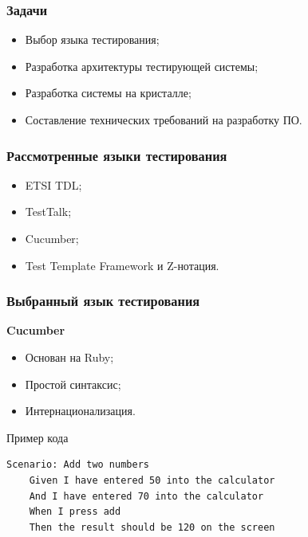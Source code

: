 \documentclass{beamer}
\begin{document}

\begin{frame}
\frametitle{Задачи}
\begin{itemize}
\item Выбор языка тестирования;
\item Разработка архитектуры тестирующей системы;
\item Разработка системы на кристалле;
\item Составление технических требований на разработку ПО.
\end{itemize}
\end{frame}


\begin{frame}
\frametitle{Рассмотренные языки тестирования}
\begin{itemize}
\item ETSI TDL;
\item TestTalk;
\item Cucumber;
\item Test Template Framework и Z-нотация.
\end{itemize}
\end{frame}


\begin{frame}[fragile]
\frametitle{Выбранный язык тестирования}
\textbf{Cucumber}
\begin{itemize}
\item Основан на Ruby;
\item Простой синтаксис;
\item Интернационализация.
\end{itemize}
\begin{block}{Пример кода}
\begin{verbatim}
Scenario: Add two numbers
    Given I have entered 50 into the calculator
    And I have entered 70 into the calculator
    When I press add
    Then the result should be 120 on the screen
\end{verbatim}
\end{block}
\end{frame}

\end{document}

